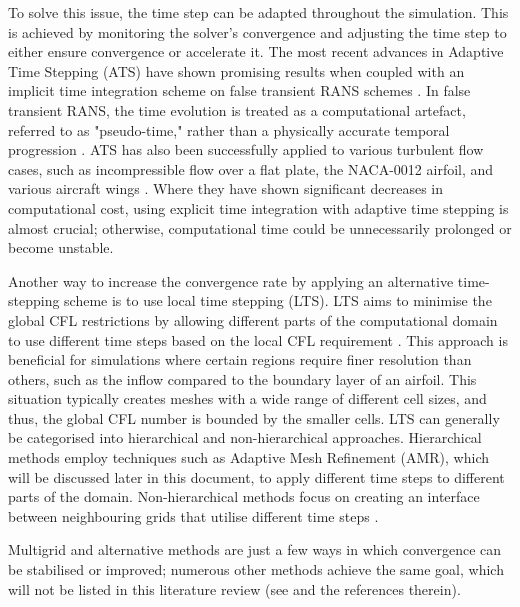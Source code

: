 To solve this issue, the time step can be adapted throughout the simulation. This is achieved by monitoring the solver's convergence and adjusting the time step to either ensure convergence or accelerate it. The most recent advances in Adaptive Time Stepping (ATS) have shown promising results when coupled with an implicit time integration scheme on false transient RANS schemes \cite{Nived2025}. In false transient RANS, the time evolution is treated as a computational artefact, referred to as "pseudo-time," rather than a physically accurate temporal progression \cite{Nived2025}. ATS has also been successfully applied to various turbulent flow cases, such as incompressible flow over a flat plate, the NACA-0012 airfoil, and various aircraft wings \cite{Nived2025}. Where they have shown significant decreases in computational cost, using explicit time integration with adaptive time stepping is almost crucial; otherwise, computational time could be unnecessarily prolonged or become unstable. 

Another way to increase the convergence rate by applying an alternative time-stepping scheme is to use local time stepping (LTS). LTS aims to minimise the global CFL restrictions by allowing different parts of the computational domain to use different time steps based on the local CFL requirement \cite{Esnault2010}. This approach is beneficial for simulations where certain regions require finer resolution than others, such as the inflow compared to the boundary layer of an airfoil. This situation typically creates meshes with a wide range of different cell sizes, and thus, the global CFL number is bounded by the smaller cells. LTS can generally be categorised into hierarchical and non-hierarchical approaches. Hierarchical methods employ techniques such as Adaptive Mesh Refinement (AMR), which will be discussed later in this document, to apply different time steps to different parts of the domain. Non-hierarchical methods focus on creating an interface between neighbouring grids that utilise different time steps \cite{Esnault2010}.

Multigrid and alternative methods are just a few ways in which convergence can be stabilised or improved; numerous other methods achieve the same goal, which will not be listed in this literature review (see \cite{Nived2025, vermeire2013, Esnault2010, Kalkote2019, Sreejith2022} and the references therein). 



